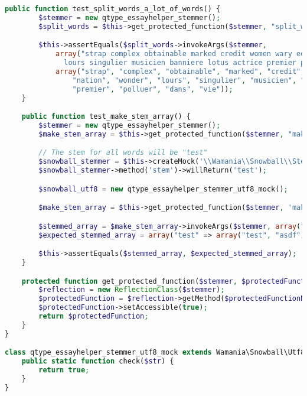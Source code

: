 \begin{lstlisting}[language=php,frame=l,style=default]
    public function test_split_words_a_lot_of_words() {
        $stemmer = new qtype_essayhelper_stemmer();
        $split_words = $this->get_protected_function($stemmer, "split_words");

        $this->assertEquals($split_words->invokeArgs($stemmer,
            array("strap complex obtainable marked credit women wary educate nation wonder
              lours singulier musicien banniere lotus actrice premier polluer dans vie")),
            array("strap", "complex", "obtainable", "marked", "credit", "women", "wary", "educate",
                "nation", "wonder", "lours", "singulier", "musicien", "banni\`ere", "lotus", "actrice",
                "premier", "polluer", "dans", "vie"));
    }

    public function test_make_stem_array() {
        $stemmer = new qtype_essayhelper_stemmer();
        $make_stem_array = $this->get_protected_function($stemmer, "make_stem_array");

        // The stem for all words will be "test"
        $snowball_stemmer = $this->createMock('\\Wamania\\Snowball\\Stemmer', array('stem'));
        $snowball_stemmer->method('stem')->willReturn('test');

        $snowball_utf8 = new qtype_essayhelper_stemmer_utf8_mock();

        $make_stem_array = $this->get_protected_function($stemmer, 'make_stem_array');

        $stemmed_array = $make_stem_array->invokeArgs($stemmer, array("test asdf", $snowball_stemmer, $snowball_utf8));
        $expected_stemmed_array = array("test" => array("test", "asdf"));

        $this->assertEquals($stemmed_array, $expected_stemmed_array);
    }

    protected function get_protected_function($stemmer, $protectedFunctionName) {
        $reflection = new ReflectionClass($stemmer);
        $protectedFunction = $reflection->getMethod($protectedFunctionName);
        $protectedFunction->setAccessible(true);
        return $protectedFunction;
    }
}

class qtype_essayhelper_stemmer_utf8_mock extends Wamania\Snowball\Utf8 {
    public static function check($str) {
        return true;
    }
}
\end{lstlisting}
